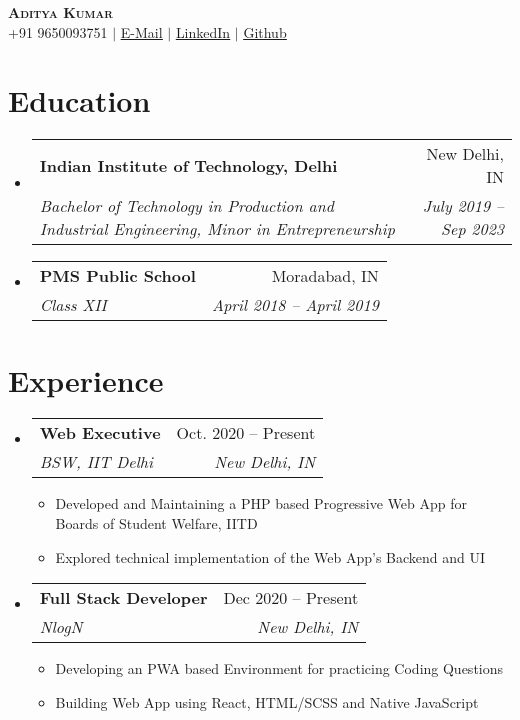 \documentclass[letterpaper,11pt]{article}
\makeatletter
\newcommand{\resumeItem}[1]{
  \item\small{
    {#1 \vspace{-2pt}}
  }
}
\newcommand{\resumeSubheading}[4]{
  \vspace{-2pt}\item
    \begin{tabular*}{0.97\textwidth}[t]{l@{\extracolsep{\fill}}r}
      \textbf{#1} & #2 \\
      \textit{\small#3} & \textit{\small #4} \\
    \end{tabular*}\vspace{-7pt}
}
\newcommand{\resumeSubHeadingListStart}{\begin{itemize}[leftmargin=0.15in, label={}]}
\newcommand{\resumeSubHeadingListEnd}{\end{itemize}}
\newcommand{\resumeItemListStart}{\begin{itemize}}
\newcommand{\resumeItemListEnd}{\end{itemize}\vspace{-5pt}}
\makeatother
\begin{document}
\begin{center}
    \textbf{\Huge \scshape Aditya Kumar} \\ \vspace{5pt}
    \small+91 9650093751 $|$ \href{mailto:adityakiitdelhi@gmail.com}{\underline{E-Mail}} $|$ 
    \href{https://linkedin.com/in/aditya-kumar-inductor}{\underline{LinkedIn}} $|$
    \href{https://github.com/inductor69}{\underline{Github}}
\end{center}


\section{Education}
  \resumeSubHeadingListStart
    \resumeSubheading
      {Indian Institute of Technology, Delhi}{New Delhi, IN}
      {Bachelor of Technology in Production and Industrial Engineering, Minor in Entrepreneurship}{July 2019 -- Sep 2023}
    \resumeSubheading
      {PMS Public School}{Moradabad, IN}
      {Class XII}{April 2018 -- April 2019}
  \resumeSubHeadingListEnd


\section{Experience}
  \resumeSubHeadingListStart

    \resumeSubheading
      {Web Executive}{Oct. 2020 -- Present}
      {BSW, IIT Delhi}{New Delhi, IN}
      \resumeItemListStart
        \resumeItem{Developed and Maintaining a PHP based Progressive Web App for Boards of Student Welfare, IITD}
        \resumeItem{Explored technical implementation of the Web App's Backend and UI}
      \resumeItemListEnd

    \resumeSubheading
      {Full Stack Developer}{Dec 2020 -- Present}
      {NlogN}{New Delhi, IN}
      \resumeItemListStart
        \resumeItem{Developing an PWA based Environment for practicing Coding Questions}
        \resumeItem{Building Web App using React, HTML/SCSS and Native JavaScript}
   
    \resumeItemListEnd

  \resumeSubHeadingListEnd


\end{document}

